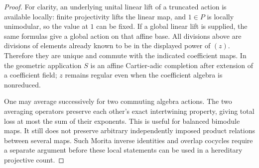 \begin{proof}
For clarity, an underlying unital linear lift of a truncated
action is available locally: finite projectivity lifts the
linear map, and $1\in P$ is locally unimodular, so the value
at $1$ can be fixed. If a global linear lift is supplied, the
same formulas give a global action on that affine base.
All divisions above are divisions of elements already known
to be in the displayed power of $(z)$. Therefore they are
unique and commute with the indicated coefficient maps.
In the geometric application $S$ is an affine Cartier-adic
completion after extension of a coefficient field; $z$ remains
regular even when the coefficient algebra is nonreduced.

One may average successively for two commuting algebra
actions. The two averaging operators preserve each other's
exact intertwining property, giving total loss at most the
sum of their exponents. This is useful for balanced bimodule
maps. It still does not preserve arbitrary independently
imposed product relations between several maps. Such Morita
inverse identities and overlap cocycles require a separate
argument before these local statements can be used in a
hereditary projective count.
\end{proof}
